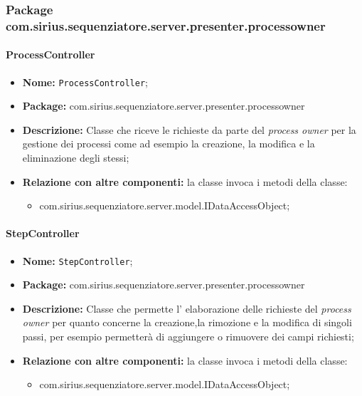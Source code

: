 \subsubsection{Package com.sirius.sequenziatore.server.presenter.processowner}
\paragraph{ProcessController}
	\begin{itemize}
		\item \textbf{Nome:} \texttt{ProcessController};
		\item \textbf{Package:} com.sirius.sequenziatore.server.presenter.processowner
		\item \textbf{Descrizione:} Classe che riceve le richieste da parte del \textit{process owner} per la gestione dei processi come ad esempio la creazione, la modifica e la eliminazione degli stessi;
		\item \textbf{Relazione con altre componenti:} la classe invoca i metodi della classe:
		\begin{itemize}
			\item com.sirius.sequenziatore.server.model.IDataAccessObject;
		\end{itemize}
	\end{itemize}
\paragraph{StepController}
	\begin{itemize}
		\item \textbf{Nome:} \texttt{StepController};
		\item \textbf{Package:} com.sirius.sequenziatore.server.presenter.processowner
		\item \textbf{Descrizione:} Classe che permette l' elaborazione delle richieste del \textit{process owner} per quanto concerne la creazione,la rimozione e la modifica di singoli passi, per esempio permetterà di aggiungere o rimuovere dei campi richiesti;
		\item \textbf{Relazione con altre componenti:} la classe invoca i metodi della classe:
		\begin{itemize}
			\item com.sirius.sequenziatore.server.model.IDataAccessObject;
		\end{itemize}
	\end{itemize}

